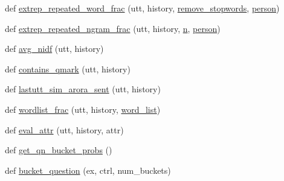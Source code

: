 \begin{DoxyCompactItemize}
\item 
def \hyperlink{namespaceprojects_1_1controllable__dialogue_1_1controllable__seq2seq_1_1controls_a0d42f675e7a8008b5300de33d6b393b1}{extrep\+\_\+repeated\+\_\+word\+\_\+frac} (utt, history, \hyperlink{namespaceprojects_1_1controllable__dialogue_1_1controllable__seq2seq_1_1controls_a16bf79fe7e9cbacf6cf5792aaaee4f88}{remove\+\_\+stopwords}, \hyperlink{namespaceprojects_1_1controllable__dialogue_1_1controllable__seq2seq_1_1controls_a852809286248c6b4113e7ca467f32eaf}{person})
\item 
def \hyperlink{namespaceprojects_1_1controllable__dialogue_1_1controllable__seq2seq_1_1controls_acf2eb363af8558f8f2e8afbacdc52c07}{extrep\+\_\+repeated\+\_\+ngram\+\_\+frac} (utt, history, \hyperlink{namespaceprojects_1_1controllable__dialogue_1_1controllable__seq2seq_1_1controls_a8825ded618f6b3f758fdfc5c4a3bdc71}{n}, \hyperlink{namespaceprojects_1_1controllable__dialogue_1_1controllable__seq2seq_1_1controls_a852809286248c6b4113e7ca467f32eaf}{person})
\item 
def \hyperlink{namespaceprojects_1_1controllable__dialogue_1_1controllable__seq2seq_1_1controls_a962ffde4150bf72ac52327fb4f0a3c78}{avg\+\_\+nidf} (utt, history)
\item 
def \hyperlink{namespaceprojects_1_1controllable__dialogue_1_1controllable__seq2seq_1_1controls_a9ff7f284ebe0c571ce6335d4aab2bb36}{contains\+\_\+qmark} (utt, history)
\item 
def \hyperlink{namespaceprojects_1_1controllable__dialogue_1_1controllable__seq2seq_1_1controls_af87f0a728f9bbb385f160b47ca033c31}{lastutt\+\_\+sim\+\_\+arora\+\_\+sent} (utt, history)
\item 
def \hyperlink{namespaceprojects_1_1controllable__dialogue_1_1controllable__seq2seq_1_1controls_a7500dad14e58978ad3903db08a10579e}{wordlist\+\_\+frac} (utt, history, \hyperlink{namespaceprojects_1_1controllable__dialogue_1_1controllable__seq2seq_1_1controls_aff6fb7782b35c70ac746395cb4ab0ac4}{word\+\_\+list})
\item 
def \hyperlink{namespaceprojects_1_1controllable__dialogue_1_1controllable__seq2seq_1_1controls_afc2b447cbf1dcb4a754d080d2e611c24}{eval\+\_\+attr} (utt, history, attr)
\item 
def \hyperlink{namespaceprojects_1_1controllable__dialogue_1_1controllable__seq2seq_1_1controls_a3a84e701c32a5fbb01d5676714d83f03}{get\+\_\+qn\+\_\+bucket\+\_\+probs} ()
\item 
def \hyperlink{namespaceprojects_1_1controllable__dialogue_1_1controllable__seq2seq_1_1controls_ab3bad4782be153fd04645ff419024311}{bucket\+\_\+question} (ex, ctrl, num\+\_\+buckets)

\end{DoxyCompactItemize}
